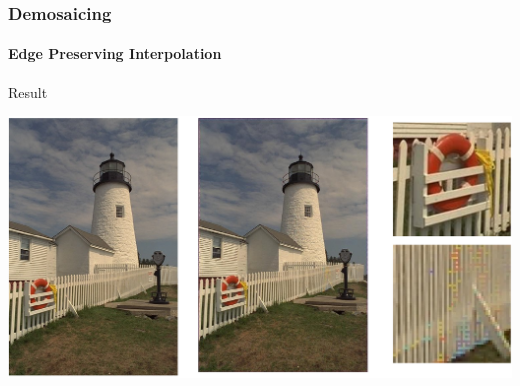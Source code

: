 \documentclass{beamer}
\begin{document}
\begin{frame}
\frametitle{Demosaicing}
\framesubtitle{Edge Preserving Interpolation}
\begin{block}{Result}
\begin{center}
\includegraphics[scale=0.35]{images/L7_res_EPI.png}
\end{center}

\end{block}
\end{frame}
\end{document}
